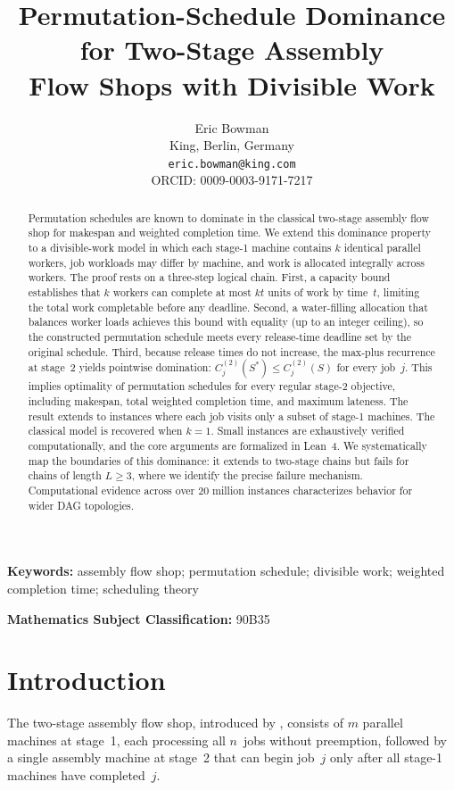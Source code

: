 \documentclass[11pt,titlepage]{article}
\title{Permutation-Schedule Dominance for Two-Stage Assembly\\
  Flow Shops with Divisible Work}
\author{Eric Bowman\\
  \small King, Berlin, Germany\\
  \small \texttt{eric.bowman@king.com}\\
  \small ORCID: 0009-0003-9171-7217}
\date{}
\begin{document}
\maketitle

\begin{abstract}
Permutation schedules are known to dominate in the classical
two-stage assembly flow shop for makespan and weighted completion time.
We extend this dominance property to a divisible-work model in
which each stage-1 machine contains $k$ identical parallel
workers, job workloads may differ by machine, and work is
allocated integrally across workers. The proof rests on a
three-step logical chain. First, a capacity bound establishes
that $k$ workers can complete at most $kt$ units of work by
time~$t$, limiting the total work completable before any
deadline. Second, a water-filling allocation that balances
worker loads achieves this bound with equality (up to an
integer ceiling), so the constructed permutation schedule
meets every release-time deadline set by the original schedule.
Third, because release times do not increase, the max-plus
recurrence at stage~2 yields pointwise domination:
$C^{(2)}_j(S^*) \leq C^{(2)}_j(S)$ for every job~$j$.
This implies optimality of permutation schedules for every
regular stage-2 objective, including makespan, total weighted
completion time, and maximum lateness. The result extends to
instances where each job visits only a subset of stage-1
machines. The classical model is recovered when $k = 1$.
Small instances are exhaustively verified computationally,
and the core arguments are formalized in Lean~4.
We systematically map the boundaries of this dominance:
it extends to two-stage chains but fails for chains of
length $L \geq 3$, where we identify the precise failure
mechanism. Computational evidence across over $20$ million
instances characterizes behavior for wider DAG topologies.
\end{abstract}

\noindent\textbf{Keywords:} assembly flow shop; permutation
schedule; divisible work; weighted completion time; scheduling
theory

\noindent\textbf{Mathematics Subject Classification:} 90B35

\section{Introduction}
\label{sec:intro}

The two-stage assembly flow shop, introduced by
\textcite{lee1993}, consists of $m$ parallel machines at
stage~1, each processing all $n$~jobs without preemption,
followed by a single assembly machine at stage~2 that can begin
job~$j$ only after all stage-1 machines have completed~$j$.
\end{document}
